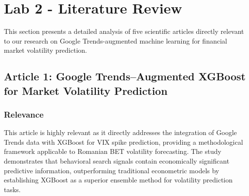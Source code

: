 \documentclass[12pt,a4paper]{article}
\begin{document}
\section{Lab 2 - Literature Review}

This section presents a detailed analysis of five scientific articles directly relevant to our research on Google Trends-augmented machine learning for financial market volatility prediction.

\subsection{Article 1: Google Trends–Augmented XGBoost for Market Volatility Prediction}

\subsubsection{Relevance}
This article is highly relevant as it directly addresses the integration of Google Trends data with XGBoost for VIX spike prediction, providing a methodological framework applicable to Romanian BET volatility forecasting. The study demonstrates that behavioral search signals contain economically significant predictive information, outperforming traditional econometric models by establishing XGBoost as a superior ensemble method for volatility prediction tasks.
\end{document}
